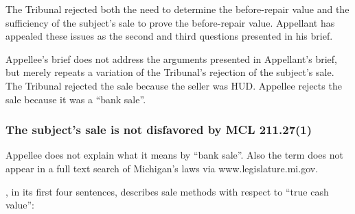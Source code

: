 \documentclass[12pt,\documentclassflag]{michiganCourtOfAppealsBrief}
\begin{document}
The Tribunal rejected both the need to determine the before-repair value and the sufficiency of the subject's sale to prove the before-repair value. Appellant has appealed these issues as the second and third questions presented in his brief.

Appellee's brief does not address the arguments presented in Appellant's brief, but merely repeats a variation of the Tribunal's rejection of the subject's sale. The Tribunal rejected the sale because the seller was HUD. Appellee rejects the sale because it was a ``bank sale''.

\subsubsection{The subject's sale is not disfavored by MCL 211.27(1)}


Appellee does not explain what it means by ``bank sale''. Also the term does not appear in a full text search of Michigan's laws via www.legislature.mi.gov.

\cite[s]{MCL 211.27(1)}, in its first four sentences, describes sale methods with respect to ``true cash value'':
\end{document}
